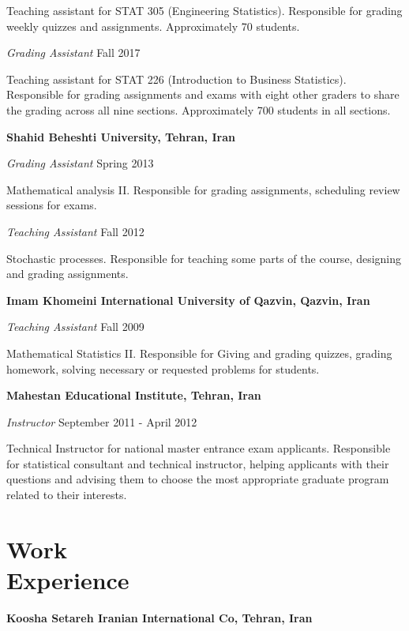 \documentclass[margin,line]{res}
\begin{document}
\begin{resume}
\vspace{-.3cm}
Teaching assistant for STAT 305  (Engineering Statistics). Responsible for grading weekly quizzes and assignments. Approximately 70 students.

{\em Grading Assistant} \hfill { Fall 2017}

\vspace{-.3cm}
Teaching assistant for STAT 226  (Introduction to Business Statistics). Responsible for grading assignments and exams with eight other graders to share the grading across all nine sections. Approximately 700 students in all sections.


{\bf Shahid Beheshti University, Tehran, Iran}

{\em Grading Assistant} \hfill { Spring 2013}

\vspace{-.3cm}
Mathematical analysis II. Responsible for grading assignments, scheduling review sessions for exams. 

{\em Teaching Assistant} \hfill { Fall 2012}

\vspace{-.3cm}
Stochastic processes. Responsible for teaching some parts of the course, designing and grading assignments. 

{\bf Imam Khomeini International University of Qazvin, Qazvin, Iran}

{\em Teaching Assistant} \hfill { Fall 2009}

\vspace{-.3cm}
Mathematical Statistics II. Responsible for Giving and grading quizzes, grading homework, solving necessary or requested problems for students. 

{\bf Mahestan Educational Institute, Tehran, Iran}

\vspace{-.3cm}
{\em Instructor} \hfill { September 2011 - April 2012}

\vspace{-.3cm}
Technical Instructor for national master entrance exam applicants. Responsible for statistical consultant and technical instructor, helping applicants with their questions and advising them to choose the most appropriate graduate program related to their interests.


\section{\sc Work \\ Experience}
{\bf Koosha Setareh Iranian International Co, Tehran, Iran}



\end{resume}
\end{document}
